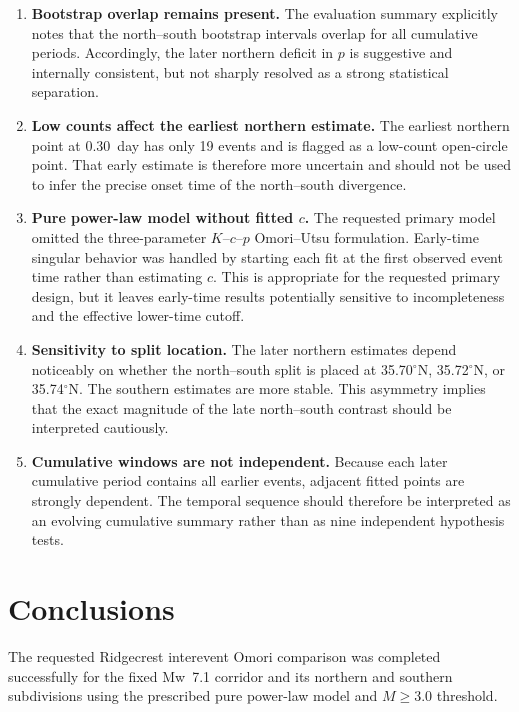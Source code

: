 \documentclass[11pt]{article}
\begin{document}
\begin{enumerate}[leftmargin=2em]
    \item \textbf{Bootstrap overlap remains present.} The evaluation summary explicitly notes that the north--south bootstrap intervals overlap for all cumulative periods. Accordingly, the later northern deficit in $p$ is suggestive and internally consistent, but not sharply resolved as a strong statistical separation.

    \item \textbf{Low counts affect the earliest northern estimate.} The earliest northern point at 0.30~day has only 19 events and is flagged as a low-count open-circle point. That early estimate is therefore more uncertain and should not be used to infer the precise onset time of the north--south divergence.

    \item \textbf{Pure power-law model without fitted $c$.} The requested primary model omitted the three-parameter $K$--$c$--$p$ Omori--Utsu formulation. Early-time singular behavior was handled by starting each fit at the first observed event time rather than estimating $c$. This is appropriate for the requested primary design, but it leaves early-time results potentially sensitive to incompleteness and the effective lower-time cutoff.

    \item \textbf{Sensitivity to split location.} The later northern estimates depend noticeably on whether the north--south split is placed at 35.70$^{\circ}$N, 35.72$^{\circ}$N, or 35.74$^{\circ}$N. The southern estimates are more stable. This asymmetry implies that the exact magnitude of the late north--south contrast should be interpreted cautiously.

    \item \textbf{Cumulative windows are not independent.} Because each later cumulative period contains all earlier events, adjacent fitted points are strongly dependent. The temporal sequence should therefore be interpreted as an evolving cumulative summary rather than as nine independent hypothesis tests.
\end{enumerate}

\section{Conclusions}
The requested Ridgecrest interevent Omori comparison was completed successfully for the fixed Mw~7.1 corridor and its northern and southern subdivisions using the prescribed pure power-law model and $M \geq 3.0$ threshold.
\end{document}
